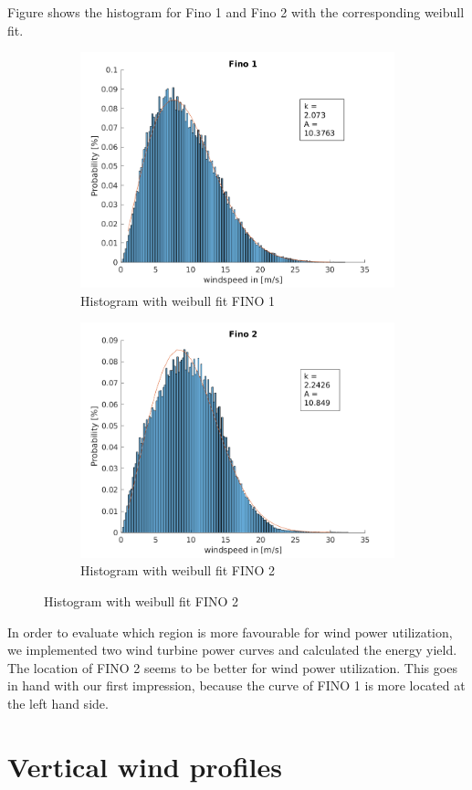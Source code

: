 \documentclass[10pt]{article}
\begin{document}
Figure shows the histogram for Fino 1 and Fino 2 with the corresponding weibull fit.
\begin{figure}[htb!]

\begin{subfigure}{0.5\textwidth}
  \centering
  \includegraphics[width=1\linewidth]{../figures/Hist_withfit_Fino1.png}
  \caption{Histogram with weibull fit FINO 1}
  \label{fig:Windrose_Fino1}
\end{subfigure}
\begin{subfigure}{0.5\textwidth}
  \centering
  \includegraphics[width=1\linewidth]{../figures/Hist_withfit_Fino2.png}
  \caption{Histogram with weibull fit FINO 2}
    \label{fig:Windrose_Fino2}
\end{subfigure}
\label{fig:WindRose1_valdidation}
\end{figure}
In order to evaluate which region is more favourable for wind power utilization, we implemented two wind turbine power curves and calculated the energy yield.
The location of FINO 2 seems to be better for wind power utilization. This goes in hand with our first impression, because the curve of FINO 1 is more located at the left hand side.

\section{Vertical wind profiles}
\end{document}
